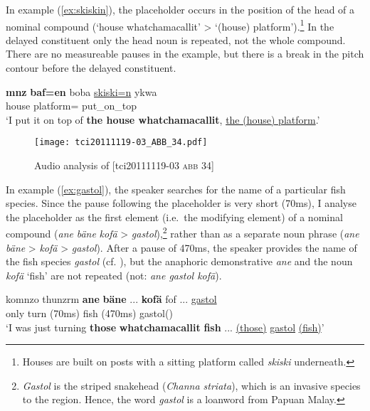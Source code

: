 \documentclass[output=paper,colorlinks,citecolor=brown]{langscibook}
\begin{document}
In example (\ref{ex:skiskin}), the placeholder occurs in the position of the head of a nominal compound (`house whatchamacallit' > `(house) platform').\footnote{Houses are built on posts with a sitting platform called \textit{skiski} underneath.} In the delayed constituent only the head noun is repeated, not the whole compound. There are no measureable pauses in the example, but there is a break in the pitch contour before the delayed constituent.

\ea \label{ex:skiskin}
    \gll \textbf{mnz} \textbf{baf=en} boba \uline{skiski=n} ykwa\\
    house   platform= put\_on\_top\\
    \glt `I put it on top of \textbf{the house whatchamacallit}, \uline{the (house) platform}.' 
\z

\begin{figure}
    \texttt{[image: tci20111119-03\_ABB\_34.pdf]}
    \caption{Audio analysis of [tci20111119-03 \textsc{abb} 34]}
    \label{fig:doehler:skiskin}
\end{figure}

In example (\ref{ex:gastol}), the speaker searches for the name of a particular fish species. Since the pause following the placeholder is very short (70ms), I analyse the placeholder as the first element (i.e.\ the modifying element) of a nominal compound (\textit{ane} \textit{bäne} \textit{kofä} > \textit{gastol}),\footnote{\textit{Gastol} is the striped snakehead (\textit{Channa striata}), which is an invasive species to the region. Hence, the word \textit{gastol} is a loanword from Papuan Malay.} rather than as a separate noun phrase (\textit{ane} \textit{bäne} > \textit{kofä} > \textit{gastol}). After a pause of 470ms, the speaker provides the name of the fish species \textit{gastol} (cf. ), but the anaphoric demonstrative \textit{ane} and the noun \textit{kofä} `fish' are not repeated (not: \textit{ane gastol kofä}).

\ea \label{ex:gastol}
    \gll komnzo thunzrm \textbf{ane} \textbf{bäne} ... \textbf{kofä} fof ... \uline{gastol}\\
    only turn   (70ms) fish  (470ms) gastol()\\
    \glt `I was just turning \textbf{those} \textbf{whatchamacallit} \textbf{fish} ... \uline{(those)} \uline{gastol} \uline{(fish)}' 
\z
\end{document}
